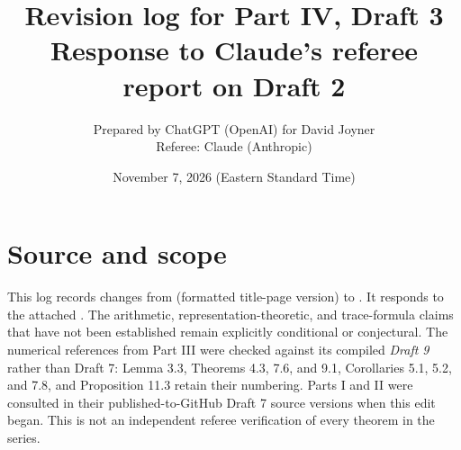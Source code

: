 \documentclass[11pt]{article}
\title{Revision log for Part IV, Draft 3\\
\large Response to Claude's referee report on Draft 2}
\author{Prepared by ChatGPT (OpenAI) for David Joyner\\
\normalsize Referee: Claude (Anthropic)}
\date{November 7, 2026 (Eastern Standard Time)}
\begin{document}
\maketitle
\section*{Source and scope}
This log records changes from 
(formatted title-page version) to .
It responds to the attached .
The arithmetic, representation-theoretic, and trace-formula claims
that have not been established remain explicitly conditional or conjectural.
The numerical references from Part III were checked against its compiled
\emph{Draft 9} rather than Draft 7: Lemma 3.3, Theorems 4.3, 7.6,
and 9.1, Corollaries 5.1, 5.2, and 7.8, and Proposition 11.3
retain their numbering.  Parts I and II were consulted in their
published-to-GitHub Draft 7 source versions when this edit began.
This is not an independent referee verification of every theorem in the series.
\end{document}
